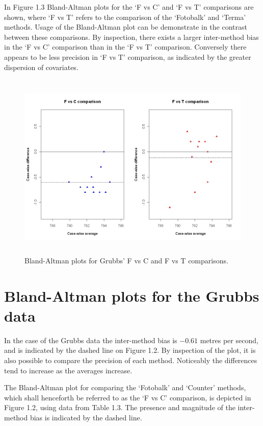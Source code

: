 \documentclass[12pt, a4paper]{report}
\theoremstyle{plain}
\theoremstyle{definition}
\theoremstyle{remark}
\begin{document}
	
	
	In Figure 1.3 Bland-Altman plots for the `F vs C' and `F vs T'
	comparisons are shown, where `F vs T' refers to the comparison of
	the `Fotobalk' and `Terma' methods. Usage of the Bland-Altman plot
	can be demonstrate in the contrast between these comparisons. By inspection, there exists a larger inter-method bias in the `F vs C' comparison than in the `F vs T' comparison. Conversely there
	appears to be less precision in `F vs T' comparison, as indicated
	by the greater dispersion of covariates.
	
	\begin{figure}[h!]
		\begin{center}
			\includegraphics[height=90mm]{images/GrubbsDataTwoBAplots.jpeg}
			\caption{Bland-Altman plots for Grubbs' F vs C and F vs T comparisons.}\label{GrubbsDataTwoBAplots}
		\end{center}
	\end{figure}
	
	\newpage
	
	

	\section{Bland-Altman plots for the Grubbs data}
	
	In the case of the Grubbs data the inter-method bias is $-0.61$ metres per second, and is indicated by the dashed line on Figure 1.2. By inspection of the plot, it is also possible to compare the precision of each method. Noticeably the differences tend to increase as the averages increase.
	
	
	The Bland-Altman plot for comparing the `Fotobalk' and `Counter'
	methods, which shall henceforth be referred to as the `F vs C'
	comparison,  is depicted in Figure 1.2, using data from Table 1.3.
	The presence and magnitude of the inter-method bias is indicated
	by the dashed line.
	\newpage
	
\end{document}
